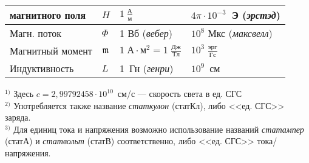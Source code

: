 \begin{booksupplement}
\begin{table}
\begin{tabular}{m{29mm}m{11mm}m{26mm}m{35mm}}
        магнитного поля & ${H}$ & $1~\frac{А}{м}$
                        & $4\pi\cdot10^{-3}$~Э (\emph{эрстэд})                  \\ \hline
        Магн. поток  & $\Phi$ & 1 Вб (\emph{вебер})
                     & $10^8$ Мкс (\emph{максвелл})                    \bigstrut\\ \hline
        Магнитный момент    & $\mathfrak{m}$ & $1\;А\cdot м^2 = 1\;\frac{Дж}{Тл}$
                        & $10^3\;\frac{эрг}{Гс}$                       \bigstrut\\ \hline
        Индуктивность & $L$ & 1~Гн (\emph{генри})
                      & $10^9$~см                                      \bigstrut\\
\bottomrule[1pt]
    \end{tabular}
\endgroup    
    \vspace*{-0.7\baselineskip}
    \flushleft
    \noindent\footnotesize{}$^{1)}$ Здесь $c = 2,99792458\cdot 10^{10}$~см/с --- скорость света в ед. СГС\\
    $^{2)}$ Употребляется также название \emph{статкулон} (статКл),
    либо <<ед. СГС>> заряда. \\
    $^{3)}$ Для единиц тока и напряжения возможно использование
    названий \emph{статампер} (статА) и \emph{статвольт} (статВ) соответственно,
    либо <<ед. СГС>> тока/напряжения.
    \label{table:SICGS}
\end{table}

\newpage


\end{booksupplement}
